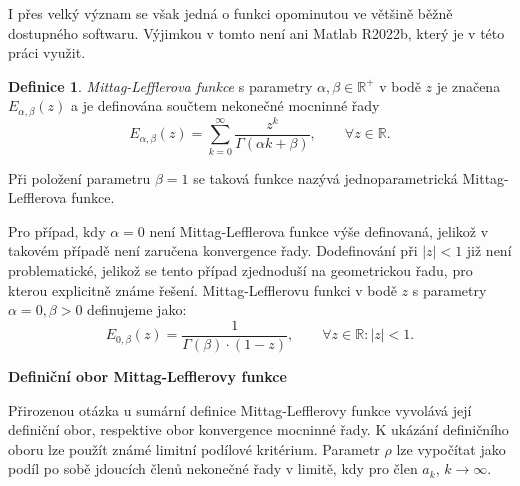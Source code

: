 \documentclass[a4paper,12pt,twoside]{article}
\theoremstyle{definition}
\newtheorem{defin}[veta]{Definice}
\theoremstyle{remark}
\numberwithin{equation}{section}
\numberwithin{table}{section}
\numberwithin{figure}{section}
\newcommand{\R}{\mathbb{R}}
\begin{document}
I přes velký význam se však jedná o funkci opominutou ve většině běžně dostupného softwaru. Výjimkou v tomto není ani Matlab R2022b, který je v této práci využit.

\begin{defin}\label{DefinMLfce} %
	\emph{Mittag-Lefflerova funkce} s parametry $\alpha, \beta \in \R^{+}$ v bodě $z$ je značena $E_{\alpha, \beta} \left( z\right)$ a je definována součtem nekonečné mocninné řady
	$$
	E_{\alpha, \beta} \left( z\right) =  \sum_{k=0}^{\infty} \frac{z^{k}}{\Gamma\left( \alpha k +\beta \right)}, \qquad \forall z \in  \R.  	
	$$
\end{defin}

Při položení parametru $\beta = 1$ se taková funkce nazývá jednoparametrická Mittag-Lefflerova funkce.


Pro případ, kdy $\alpha = 0$ není Mittag-Lefflerova funkce výše definovaná, jelikož v takovém případě není zaručena konvergence řady. Dodefinování při $|z| < 1$ již není problematické, jelikož se tento případ zjednoduší na geometrickou řadu, pro kterou explicitně známe řešení. Mittag-Lefflerovu funkci v bodě $z$ s parametry $\alpha = 0, \beta > 0$ definujeme jako:
\begin{equation}
	E_{0, \beta}\left(z\right) = \frac{1}{\Gamma \left(\beta\right)\cdot \left(1-z\right)}, \qquad \forall z \in \R: |z| < 1.
\end{equation}

\noindent \textbf{Definiční obor Mittag-Lefflerovy funkce}

\medskip
\noindent Přirozenou otázka u sumární definice Mittag-Lefflerovy funkce vyvolává její definiční obor, respektive obor konvergence mocninné řady. 
K ukázání definičního oboru lze použít známé limitní podílové kritérium. Parametr $\rho$ lze vypočítat jako podíl po sobě jdoucích členů nekonečné řady v limitě, kdy pro člen $a_k$, $k \rightarrow \infty $.
\end{document}

